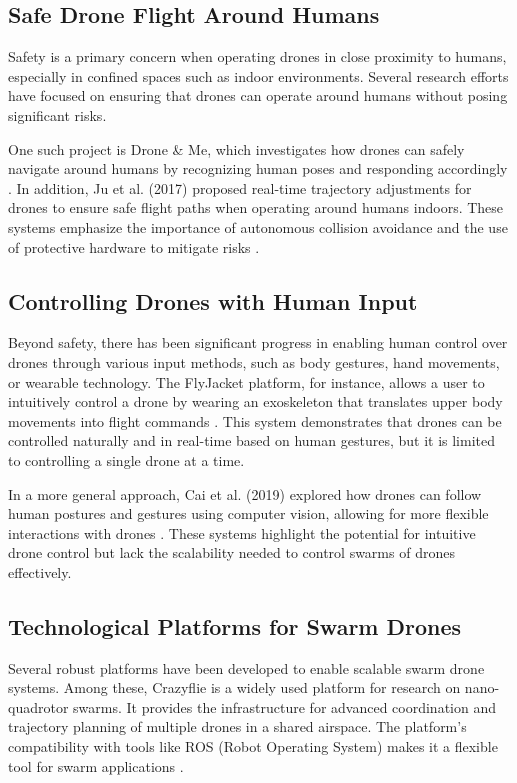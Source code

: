 \subsection{Safe Drone Flight Around Humans}

Safety is a primary concern when operating drones in close proximity to humans, especially in confined spaces such as indoor environments. Several research efforts have focused on ensuring that drones can operate around humans without posing significant risks.

One such project is Drone \& Me, which investigates how drones can safely navigate around humans by recognizing human poses and responding accordingly \cite{drone_me}. In addition, Ju et al. (2017) proposed real-time trajectory adjustments for drones to ensure safe flight paths when operating around humans indoors. These systems emphasize the importance of autonomous collision avoidance and the use of protective hardware to mitigate risks \cite{ju_safety}.

\subsection{ Controlling Drones with Human Input}

Beyond safety, there has been significant progress in enabling human control over drones through various input methods, such as body gestures, hand movements, or wearable technology. The FlyJacket platform, for instance, allows a user to intuitively control a drone by wearing an exoskeleton that translates upper body movements into flight commands \cite{flyjacket}. This system demonstrates that drones can be controlled naturally and in real-time based on human gestures, but it is limited to controlling a single drone at a time.

In a more general approach, Cai et al. (2019) explored how drones can follow human postures and gestures using computer vision, allowing for more flexible interactions with drones \cite{cai_human_drone}. These systems highlight the potential for intuitive drone control but lack the scalability needed to control swarms of drones effectively.

\subsection{Technological Platforms for Swarm Drones}

Several robust platforms have been developed to enable scalable swarm drone systems. Among these, Crazyflie is a widely used platform for research on nano-quadrotor swarms. It provides the infrastructure for advanced coordination and trajectory planning of multiple drones in a shared airspace. The platform’s compatibility with tools like \gls{ROS} (Robot Operating System) makes it a flexible tool for swarm applications \cite{crazyflie}.

